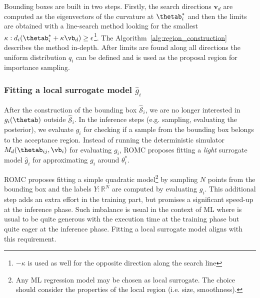 Bounding boxes are built in two steps. Firstly, the search directions
$\mathbf{v}_d$ are computed as the eigenvectors of the curvature at
$\thetab_i^*$ and then the limits are obtained with a line-search
method looking for the smallest
$\kappa: d_i(\thetab_i^* + \kappa \vb_d) \geq
\epsilon$\footnote{$-\kappa$ is used as well for the opposite
  direction along the search line}. The
Algorithm~\ref{alg:region_construction} describes the method
in-depth. After limits are found along all directions the uniform
distribution $q_i$ can be defined and is used as the proposal region
for importance sampling.


\subsubsection*{Fitting a local surrogate model $\hat{g}_i$}

After the construction of the bounding box $\mathcal{\hat{S}}_i$, we
are no longer interested in $g_i(\thetab)$ outside
$\mathcal{\hat{S}}_i$. In the inference steps (e.g. sampling,
evaluating the posterior), we evaluate $g_i$ for checking if a sample
from the bounding box belongs to the acceptance region. Instead of
running the deterministic simulator $M_d(\thetab_{ij}, \vb_i)$ for
evaluating $g_i$, ROMC proposes fitting a \emph{light} surrogate model
$\hat{g}_i$ for approximating $g_i$ around $\theta_i^*$.

ROMC proposes fitting a simple quadratic model\footnote{Any ML
  regression model may be chosen as local surrogate. The choice should
  consider the properties of the local region (i.e. size,
  smoothness). } by sampling $N$ points from the bounding box and the
labels $Y: \mathbb{R}^{N}$ are computed by evaluating $g_i$. This
additional step adds an extra effort in the training part, but
promises a significant speed-up at the inference phase. Such imbalance
is usual in the context of ML where is usual to be quite generous with
the execution time at the training phase but quite eager at the
inference phase. Fitting a local surrogate model aligns with this
requirement.
